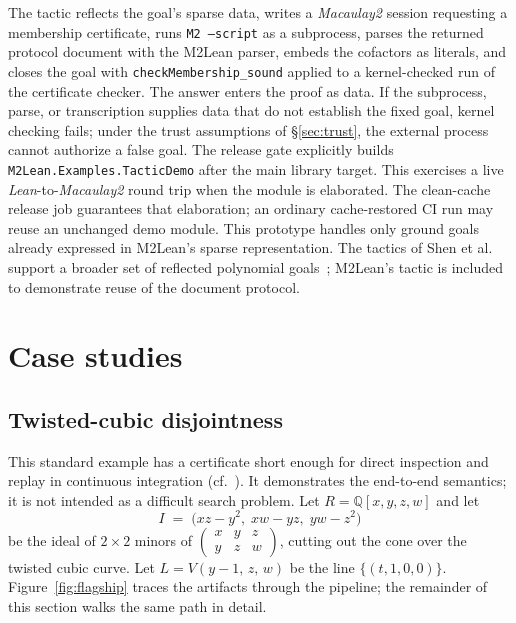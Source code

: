 \documentclass[11pt]{article}
\newcommand{\M}{\textit{Macaulay2}}
\newcommand{\lean}{\textit{Lean}}
\newcommand{\QQ}{\mathbb{Q}}
\newcommand{\code}[1]{\texttt{#1}}
\begin{document}
\noindent
The tactic reflects the goal's sparse data, writes a \M{} session
requesting a membership certificate, runs \code{M2 --script} as a
subprocess, parses the returned protocol document with the M2Lean
parser, embeds the cofactors as literals, and closes the goal with
\code{checkMembership\_sound} applied to a kernel-checked run of the
certificate checker.  The answer enters the proof as data.  If the
subprocess, parse, or transcription supplies data that do not establish
the fixed goal, kernel checking fails; under the trust assumptions of
\S\ref{sec:trust}, the external process cannot authorize a false goal.
The release gate explicitly builds \code{M2Lean.Examples.TacticDemo}
after the main library target.  This exercises a live \lean{}-to-\M{}
round trip when the module is elaborated.  The clean-cache release job
guarantees that elaboration; an ordinary cache-restored CI run may reuse
an unchanged demo module.
This prototype handles only ground goals already expressed in M2Lean's
sparse representation.  The tactics of Shen et al. support a broader
set of reflected polynomial goals~\cite{shen-polynomial-tactics}; M2Lean's
tactic is included to demonstrate reuse of the document protocol.

\section{Case studies}\label{sec:cases}

\subsection{Twisted-cubic disjointness}\label{sec:flagship}

This standard example has a certificate short enough for direct
inspection and replay in continuous integration (cf.~\cite{eisenbud}).
It demonstrates the end-to-end
semantics; it is not intended as a difficult search problem.  Let
$R = \QQ[x,y,z,w]$ and let
\[
I \;=\; \bigl(xz - y^2,\; xw - yz,\; yw - z^2\bigr)
\]
be the ideal of $2\times 2$ minors of
$\left(\begin{smallmatrix} x & y & z\\ y & z & w \end{smallmatrix}\right)$,
cutting out the cone over the twisted cubic curve.  Let
$L = V(y-1,\, z,\, w)$ be the line $\{(t,1,0,0)\}$.
Figure~\ref{fig:flagship} traces the artifacts through the pipeline;
the remainder of this section walks the same path in detail.
\end{document}
